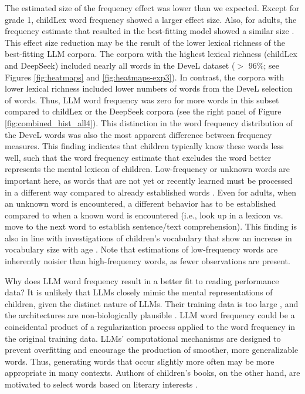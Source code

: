 \documentclass[doc, a4paper, anonymous]{apa7}
\begin{document}
The estimated size of the frequency effect was lower than we expected. Except for grade 1, childLex word frequency showed a larger effect size. Also, for adults, the frequency estimate that resulted in the best-fitting model showed a similar size \citep[see ][for effect size estimates with the DWDS word frequency]{schroter_developmental_2017}. This effect size reduction may be the result of the lower lexical richness of the best-fitting LLM corpora. The corpora with the highest lexical richness (childLex and DeepSeek) included nearly all words in the DeveL dataset ($>$ 96\%; see Figures \ref{fig:heatmaps} and \ref{fig:heatmaps-exp3}). In contrast, the corpora with lower lexical richness included lower numbers of words from the DeveL selection of words. Thus, LLM word frequency was zero for more words in this subset compared to childLex or the DeepSeek corpora (see the right panel of Figure \ref{fig:combined_hist_all4}). This distinction in the word frequency distribution of the DeveL words was also the most apparent difference between frequency measures. This finding indicates that children typically know these words less well, such that the word frequency estimate that excludes the word better represents the mental lexicon of children. Low-frequency or unknown words are important here, as words that are not yet or recently learned must be processed in a different way compared to already established words \citep[e.g., see ][]{gagl_lexical_2022,gagl_investigating_2023}. Even for adults, when an unknown word is encountered, a different behavior has to be established compared to when a known word is encountered (i.e., look up in a lexicon vs. move to the next word to establish sentence/text comprehension). This finding is also in line with investigations of children's vocabulary that show an increase in vocabulary size with age \citep[e.g., ][]{segbers_how_2017, keuleers_word_2015}. Note that estimations of low-frequency words are inherently noisier than high-frequency words, as fewer observations are present. 

Why does LLM word frequency result in a better fit to reading performance data? It is unlikely that LLMs closely mimic the mental representations of children, given the distinct nature of LLMs. Their training data is too large \citep{frank_bridging_2023}, and the architectures are non-biologically plausible \citep{frank_bridging_2023}. LLM word frequency could be a coincidental product of a regularization process applied to the word frequency in the original training data. LLMs' computational mechanisms are designed to prevent overfitting and encourage the production of smoother, more generalizable words. Thus, generating words that occur slightly more often may be more appropriate in many contexts. Authors of children's books, on the other hand, are motivated to select words based on literary interests \citep{korochkina_morphology_2025}. 
\end{document}
